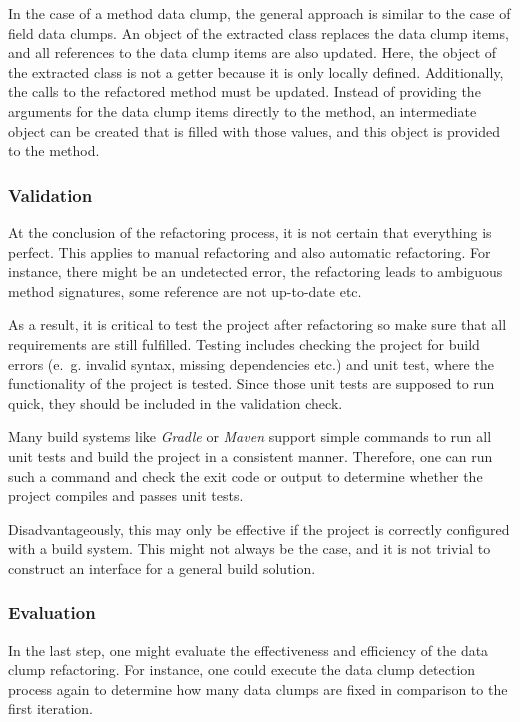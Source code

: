 In the case of a method data clump, the general approach is similar to the case of field data clumps. An object of the extracted class replaces the data clump items, and all references to the data clump items are also updated. Here, the object of the extracted class is not a getter because it is only locally defined. Additionally, the calls to the refactored method must be updated. Instead of providing the arguments for the data clump items directly to the method, an intermediate object can be created that is filled with those values, and this object is provided to the method. 

\subsubsection{Validation}

At the conclusion of the refactoring process, it is not certain that everything is perfect. This applies to manual refactoring and also automatic refactoring. For instance, there might be an undetected error, the refactoring leads to ambiguous method signatures, some reference are not up-to-date etc.

As a result, it is critical to test the project after refactoring so make sure that all requirements are still fulfilled. Testing includes checking the project for build errors (e.~g. invalid syntax, missing dependencies etc.) and unit test, where the functionality of the project is tested. Since those unit tests are supposed to run quick, they should be included in the validation check. 

Many build systems like \textit{Gradle} or \textit{Maven} support simple commands to run all unit tests and build the project in a consistent manner.  Therefore, one can run such a command and check the exit code or output to determine whether the project compiles and passes unit tests.

Disadvantageously, this may only be effective if the project is correctly configured with a build system. This might not always be the case, and it is not trivial to construct an interface for a general build solution. 

\subsubsection{Evaluation}

In the last step, one might evaluate the effectiveness and efficiency of the data clump refactoring. For instance, one could execute the data clump detection process again to determine how many data clumps are fixed in comparison to the first iteration. 

